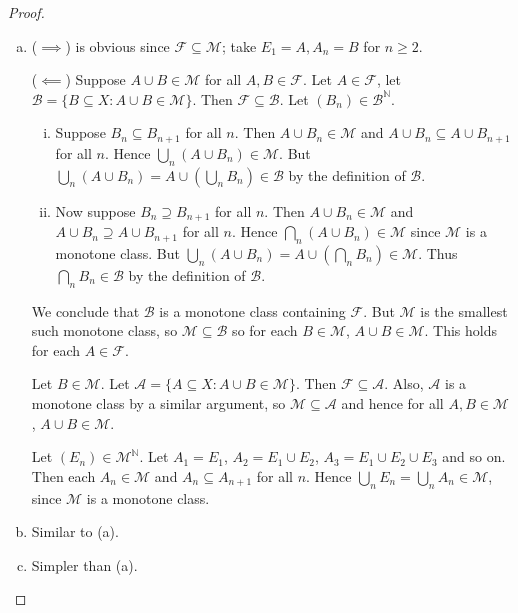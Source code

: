 \documentclass{article}
\newcommand{\N}{\mathbb{N}}
\newcommand{\F}{\mathscr{F}}
\theoremstyle{definition}
\begin{document}
\begin{proof}
    \begin{enumerate}[(a)]
        \item ($\implies$) is obvious since $\F \subseteq \mathscr{M}$; take $E_1 = A, A_n = B$ for $n \geq 2$.
        
        ($\impliedby$) Suppose $A \cup B \in \mathscr{M}$ for all $A, B \in \F$. Let $A \in \F$, let $\mathscr{B} = \{B \subseteq X : A \cup B \in \mathscr{M}\}$. Then $\F \subseteq \mathscr{B}$.
        Let $(B_n) \in \mathscr{B}^{\N}$.
        \begin{enumerate}[(i)]
            \item Suppose $B_n \subseteq B_{n+1}$ for all $n$. Then $A \cup B_n \in \mathscr{M}$ and $A \cup B_n \subseteq A \cup B_{n+1}$ for all $n$.
            Hence $\bigcup_n (A \cup B_n) \in \mathscr{M}$. But $\bigcup_n (A \cup B_n) = A \cup \left(\bigcup_n B_n\right) \in \mathscr{B}$ by the definition of $\mathscr{B}$.
            \item Now suppose $B_n \supseteq B_{n+1}$ for all $n$. Then $A \cup B_n \in \mathscr{M}$ and $A \cup B_n \supseteq A \cup B_{n+1}$ for all $n$.
            Hence $\bigcap_n (A \cup B_n) \in \mathscr{M}$ since $\mathscr{M}$ is a monotone class. But $\bigcup_n (A \cup B_n) = A \cup \left(\bigcap_n B_n \right) \in \mathscr{M}$. Thus $\bigcap_n B_n \in \mathscr{B}$ by the definition of $\mathscr{B}$.
        \end{enumerate}
        We conclude that $\mathscr{B}$ is a monotone class containing $\F$. But $\mathscr{M}$ is the smallest such monotone class, so $\mathscr{M} \subseteq \mathscr{B}$ so for each $B \in \mathscr{M}$, $A \cup B \in \mathscr{M}$.
        This holds for each $A \in \F$.
        
        Let $B \in \mathscr{M}$. Let $\mathscr{A} = \{A \subseteq X : A \cup B \in \mathscr{M}\}$. Then $\F \subseteq \mathscr{A}$. Also, $\mathscr{A}$ is a monotone class by a similar argument, so $\mathscr{M} \subseteq \mathscr{A}$ and hence for all $A, B \in \mathscr{M}$, $A \cup B \in \mathscr{M}$.
        
        Let $(E_n) \in \mathscr{M}^{\N}$. Let $A_1 = E_1$, $A_2 = E_1 \cup E_2$, $A_3 = E_1 \cup E_2 \cup E_3$ and so on. Then each $A_n \in \mathscr{M}$ and $A_n \subseteq A_{n+1}$ for all $n$. Hence $\bigcup_n E_n = \bigcup_n A_n \in \mathscr{M}$, since $\mathscr{M}$ is a monotone class.
        \item Similar to (a).
        \item Simpler than (a).
    \end{enumerate}
\end{proof}
\end{document}
